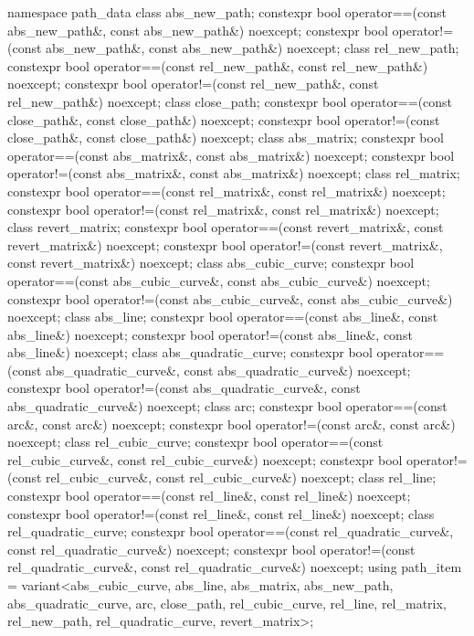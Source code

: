 \begin{codeblock}
{{{{  namespace path_data {
    class abs_new_path;
    constexpr bool operator==(const abs_new_path&, const abs_new_path&) 
      noexcept;
    constexpr bool operator!=(const abs_new_path&, const abs_new_path&) 
      noexcept;
    class rel_new_path;
    constexpr bool operator==(const rel_new_path&, const rel_new_path&) 
      noexcept;
    constexpr bool operator!=(const rel_new_path&, const rel_new_path&) 
      noexcept;
    class close_path;
    constexpr bool operator==(const close_path&, const close_path&) noexcept;
    constexpr bool operator!=(const close_path&, const close_path&) noexcept;
    class abs_matrix;
    constexpr bool operator==(const abs_matrix&, const abs_matrix&) noexcept;
    constexpr bool operator!=(const abs_matrix&, const abs_matrix&) noexcept;
    class rel_matrix;
    constexpr bool operator==(const rel_matrix&, const rel_matrix&) noexcept;
    constexpr bool operator!=(const rel_matrix&, const rel_matrix&) noexcept;
    class revert_matrix;
    constexpr bool operator==(const revert_matrix&, const revert_matrix&) 
      noexcept;
    constexpr bool operator!=(const revert_matrix&, const revert_matrix&) 
      noexcept;
    class abs_cubic_curve;
    constexpr bool operator==(const abs_cubic_curve&, const abs_cubic_curve&) 
      noexcept;
    constexpr bool operator!=(const abs_cubic_curve&, const abs_cubic_curve&) 
      noexcept;
    class abs_line;
    constexpr bool operator==(const abs_line&, const abs_line&) noexcept;
    constexpr bool operator!=(const abs_line&, const abs_line&) noexcept;
    class abs_quadratic_curve;
    constexpr bool operator==(const abs_quadratic_curve&,
      const abs_quadratic_curve&) noexcept;
    constexpr bool operator!=(const abs_quadratic_curve&,
      const abs_quadratic_curve&) noexcept;
    class arc;
    constexpr bool operator==(const arc&, const arc&) noexcept;
    constexpr bool operator!=(const arc&, const arc&) noexcept;
    class rel_cubic_curve;
    constexpr bool operator==(const rel_cubic_curve&, const rel_cubic_curve&) 
      noexcept;
    constexpr bool operator!=(const rel_cubic_curve&, const rel_cubic_curve&) 
      noexcept;
    class rel_line;
    constexpr bool operator==(const rel_line&, const rel_line&) noexcept;
    constexpr bool operator!=(const rel_line&, const rel_line&) noexcept;
    class rel_quadratic_curve;
    constexpr bool operator==(const rel_quadratic_curve&,
      const rel_quadratic_curve&) noexcept;
    constexpr bool operator!=(const rel_quadratic_curve&,
      const rel_quadratic_curve&) noexcept;
    using path_item = variant<abs_cubic_curve, abs_line, abs_matrix, 
      abs_new_path, abs_quadratic_curve, arc, close_path,
      rel_cubic_curve, rel_line, rel_matrix, rel_new_path, rel_quadratic_curve, 
      revert_matrix>;
  }
  
}}}}
\end{codeblock}
